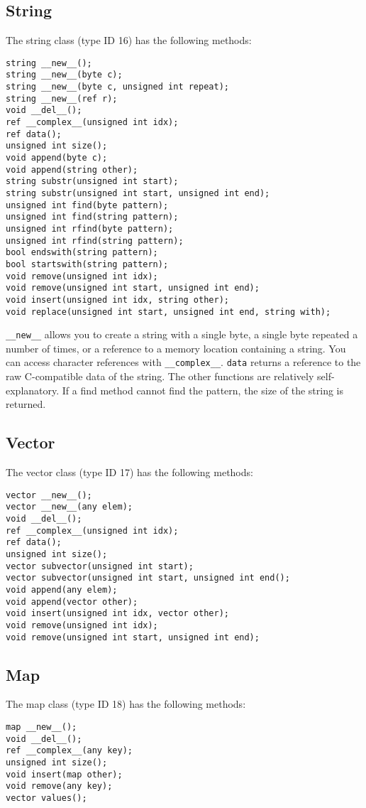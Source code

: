 \documentclass[10pt,a4paper]{article}
\begin{document}
\subsection{String}
\label{sec:stringClass}
The string class (type ID 16) has the following methods:
\begin{verbatim}
string __new__();
string __new__(byte c);
string __new__(byte c, unsigned int repeat);
string __new__(ref r);
void __del__();
ref __complex__(unsigned int idx);
ref data();
unsigned int size();
void append(byte c);
void append(string other);
string substr(unsigned int start);
string substr(unsigned int start, unsigned int end);
unsigned int find(byte pattern);
unsigned int find(string pattern);
unsigned int rfind(byte pattern);
unsigned int rfind(string pattern);
bool endswith(string pattern);
bool startswith(string pattern);
void remove(unsigned int idx);
void remove(unsigned int start, unsigned int end);
void insert(unsigned int idx, string other);
void replace(unsigned int start, unsigned int end, string with);
\end{verbatim}

\verb|__new__| allows you to create a string with a single byte, a single byte repeated a number of times, or a reference to a memory location containing a string. You can access character references with \verb|__complex__|. \verb|data| returns a reference to the raw C-compatible data of the string. The other functions are relatively self-explanatory. If a find method cannot find the pattern, the size of the string is returned.

\subsection{Vector}
The vector class (type ID 17) has the following methods:
\begin{verbatim}
vector __new__();
vector __new__(any elem);
void __del__();
ref __complex__(unsigned int idx);
ref data();
unsigned int size();
vector subvector(unsigned int start);
vector subvector(unsigned int start, unsigned int end();
void append(any elem);
void append(vector other);
void insert(unsigned int idx, vector other);
void remove(unsigned int idx);
void remove(unsigned int start, unsigned int end);
\end{verbatim}

\subsection{Map}
The map class (type ID 18) has the following methods:
\begin{verbatim}
map __new__();
void __del__();
ref __complex__(any key);
unsigned int size();
void insert(map other);
void remove(any key);
vector values();
\end{verbatim}
\end{document}
